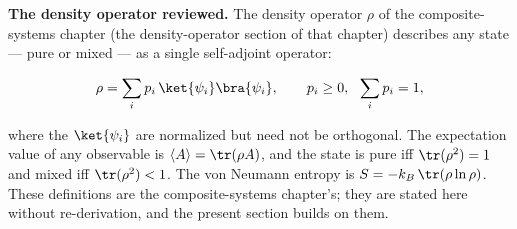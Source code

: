 \medskip\noindent\textbf{The density operator reviewed.}
The density operator $\rho$ of the composite-systems chapter (the density-operator section of that chapter) describes any state --- pure or mixed --- as a single self-adjoint operator:
\begin{linenomath}
    \begin{equation*}
        \rho = \sum_i p_i\,\ket{\psi_i}\bra{\psi_i},
        \qquad
        p_i \ge 0,\ \ \sum_i p_i = 1,
    \end{equation*}
\end{linenomath}
where the $\ket{\psi_i}$ are normalized but need not be orthogonal. The expectation value of any observable is $\langle A \rangle = \tr(\rho A)$, and the state is pure iff $\tr(\rho^2) = 1$ and mixed iff $\tr(\rho^2) < 1$. The von Neumann entropy is $S = -k_B\,\tr(\rho\ln\rho)$. These definitions are the composite-systems chapter's; they are stated here without re-derivation, and the present section builds on them.

